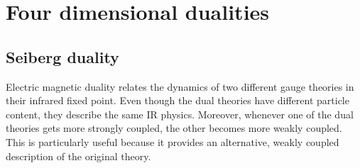 
\chapter{Four dimensional dualities}



\section{Seiberg duality}
\label{sec:seiberg_duality_4d}
Electric magnetic duality relates the dynamics of two different gauge theories in their infrared fixed point.
Even though the dual theories have different particle content, they describe the same IR physics. 
Moreover, whenever one of the dual theories gets more strongly coupled, the other becomes more weakly coupled.
This is particularly useful because it provides an alternative, weakly coupled description of the original theory.




